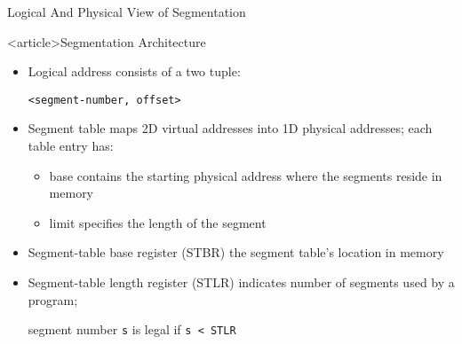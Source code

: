 
\begin{frame}{Logical And Physical View of Segmentation}
  \centering
  \mode<beamer>{ \texttt{[image: mm-seg]} }%
\end{frame}

\begin{frame}<article>{Segmentation Architecture}
  \begin{itemize}
  \item Logical address consists of a \alert{two tuple}:
    \begin{center}
      \texttt{<segment-number, offset>}
    \end{center}
  \item \alert{Segment table} maps 2D virtual addresses into 1D physical
    addresses; each table entry has:
    \begin{itemize}
    \item \alert{base} contains the starting physical address where the segments
      reside in memory
    \item \alert{limit} specifies the length of the segment
    \end{itemize}
  \item \alert{Segment-table base register (STBR)} {\pright} the segment table's
    location in memory
  \item \alert{Segment-table length register (STLR)} indicates number of
    segments used by a program;
    \begin{center}
      segment number \texttt{s} is legal if \texttt{s < STLR}
    \end{center}
  \end{itemize}
\end{frame}

